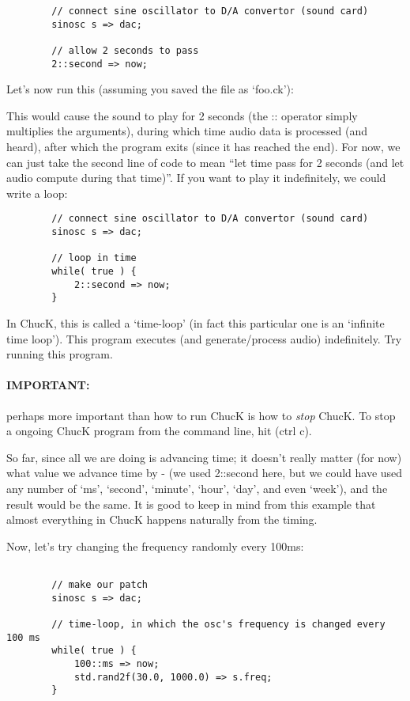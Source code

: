 \begin{verbatim}
        // connect sine oscillator to D/A convertor (sound card)
        sinosc s => dac;

        // allow 2 seconds to pass
        2::second => now;
\end{verbatim}

Let's now run this (assuming you saved the file as `foo.ck'):


This would cause the sound to play for 2 seconds (the :: operator simply multiplies the arguments), during which time audio data is processed (and heard), after which the program exits (since it has reached the end). For now, we can just take the second line of code to mean ``let time pass for 2 seconds (and let audio compute during that time)''. If you want to play it indefinitely, we could write a loop:

\begin{verbatim}
        // connect sine oscillator to D/A convertor (sound card)
        sinosc s => dac;

        // loop in time
        while( true ) {
            2::second => now;
        }
\end{verbatim}

In ChucK, this is called a `time-loop' (in fact this particular one is an `infinite time loop'). This program executes (and generate/process audio) indefinitely. Try running this program. 

\paragraph*{IMPORTANT:} perhaps more important than how to run ChucK is how to \textit{stop} ChucK.  To stop a ongoing ChucK program from the command line, hit (ctrl \- c).

So far, since all we are doing is advancing time; it doesn't really matter (for now) what value we advance time by - (we used 2::second here, but we could have used any number of `ms', `second', `minute', `hour', `day', and even `week'), and the result would be the same. It is good to keep in mind from this example that almost everything in ChucK happens naturally from the timing. 

Now, let's try changing the frequency randomly every 100ms:
\begin{verbatim}

        // make our patch
        sinosc s => dac;

        // time-loop, in which the osc's frequency is changed every 100 ms
        while( true ) {
            100::ms => now;
            std.rand2f(30.0, 1000.0) => s.freq;
        }
\end{verbatim}

